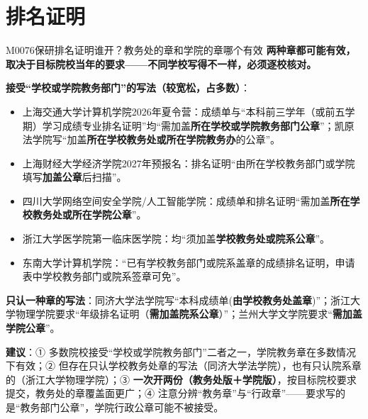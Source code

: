 \section{排名证明}
\begin{qa}{M0076}{保研排名证明谁开？教务处的章和学院的章哪个有效}
\textbf{两种章都可能有效，取决于目标院校当年的要求——不同学校写得不一样，必须逐校核对。}

\textbf{接受“学校或学院教务部门”的写法（较宽松，占多数）}：
\begin{itemize}
  \item 上海交通大学计算机学院2026年夏令营：成绩单与“本科前三学年（或前五学期）学习成绩专业排名证明”均“需加盖\textbf{所在学校或学院教务部门公章}”；凯原法学院写“加盖\textbf{所在学校教务处或所在学院教务办}的公章”。
  \item 上海财经大学经济学院2027年预报名：排名证明“由所在学校教务部门或学院填写\textbf{加盖公章}后扫描”。
  \item 四川大学网络空间安全学院/人工智能学院：成绩单和排名证明“需加盖\textbf{所在学校教务处或所在学院公章}”。
  \item 浙江大学医学院第一临床医学院：均“须加盖\textbf{学校教务处或院系公章}”。
  \item 东南大学计算机学院：“已有学校教务部门或院系盖章的成绩排名证明，申请表中学校教务部门或院系签章可免”。
\end{itemize}

\textbf{只认一种章的写法}：同济大学法学院写“本科成绩单(\textbf{由学校教务处盖章})”；浙江大学物理学院要求“年级排名证明（\textbf{需加盖院系公章}）”；兰州大学文学院要求“\textbf{需加盖学院公章}”。

\textbf{建议}：① 多数院校接受“学校或学院教务部门”二者之一，学院教务章在多数情况下有效；② 但存在只认学校教务处章的写法（同济大学法学院），也有只认院系章的（浙江大学物理学院）；③ \textbf{一次开两份（教务处版＋学院版）}，按目标院校要求提交，教务处的章覆盖面更广；④ 注意分辨“教务章”与“行政章”——要求写的是“教务部门公章”，学院行政公章可能不被接受。
\end{qa}

